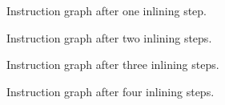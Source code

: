 \begin{figure}
\begin{center}
\end{center}
\caption{\label{fig33}
Instruction graph after one inlining step.}
\end{figure}

\begin{figure}
\begin{center}
\end{center}
\caption{\label{fig34}
Instruction graph after two inlining steps.}
\end{figure}

\begin{figure}
\begin{center}
\end{center}
\caption{\label{fig35}
Instruction graph after three inlining steps.}
\end{figure}

\begin{figure}
\begin{center}
\end{center}
\caption{\label{fig36}
Instruction graph after four inlining steps.}
\end{figure}



